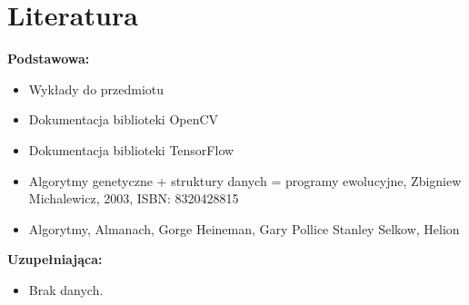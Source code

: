 \documentclass[12pt, a4paper]{article}
\begin{document}
\section{Literatura}

\textbf{Podstawowa:}
\begin{itemize}
  \item Wykłady do przedmiotu
  \item Dokumentacja biblioteki OpenCV
  \item Dokumentacja biblioteki TensorFlow
  \item Algorytmy genetyczne + struktury danych = programy ewolucyjne, Zbigniew Michalewicz, 2003, ISBN: 8320428815
  \item Algorytmy, Almanach, Gorge Heineman, Gary Pollice Stanley Selkow, Helion
\end{itemize}

\textbf{Uzupełniająca:}
\begin{itemize}
  \item Brak danych.
\end{itemize}
\end{document}
